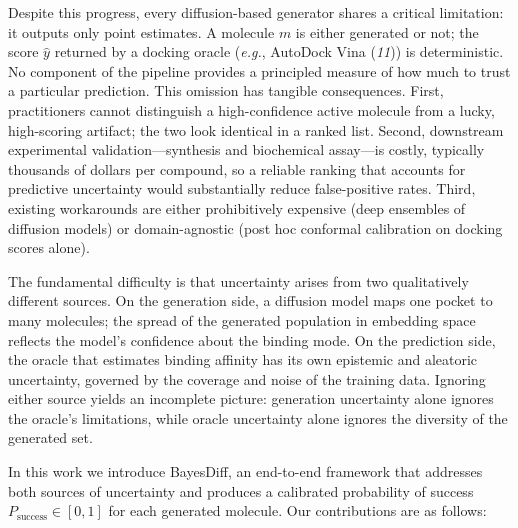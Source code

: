 \documentclass{article}
\newcommand{\Psuccess}{P_{\mathrm{success}}}
\newcommand{\eg}{\textit{e.g.}}
\newcommand{\scite}[1]{(\textit{#1})}
\begin{document}
Despite this progress, every diffusion-based generator shares a critical
limitation: it outputs only point estimates.  A molecule $m$ is either
generated or not; the score $\hat{y}$ returned by a docking oracle
(\eg, AutoDock Vina \scite{11}) is deterministic.  No component of the
pipeline provides a principled measure of how much to trust a particular
prediction.  This omission has tangible consequences.  First,
practitioners cannot distinguish a high-confidence active molecule from a
lucky, high-scoring artifact; the two look identical in a ranked list.
Second, downstream experimental validation---synthesis and biochemical
assay---is costly, typically thousands of dollars per compound, so a
reliable ranking that accounts for predictive uncertainty would
substantially reduce false-positive rates.  Third, existing workarounds
are either prohibitively expensive (deep ensembles of diffusion models)
or domain-agnostic (post hoc conformal calibration on docking scores
alone).

The fundamental difficulty is that uncertainty arises from two
qualitatively different sources.  On the generation side, a diffusion
model maps one pocket to many molecules; the spread of the generated
population in embedding space reflects the model's confidence about the
binding mode.  On the prediction side, the oracle that estimates binding
affinity has its own epistemic and aleatoric uncertainty, governed by the
coverage and noise of the training data.  Ignoring either source yields
an incomplete picture: generation uncertainty alone ignores the oracle's
limitations, while oracle uncertainty alone ignores the diversity of the
generated set.

In this work we introduce BayesDiff, an end-to-end framework that
addresses both sources of uncertainty and produces a calibrated
probability of success $\Psuccess \in [0,1]$ for each generated
molecule.  Our contributions are as follows:
\end{document}
